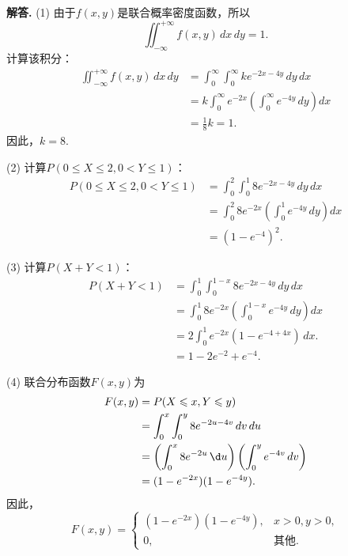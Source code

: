\documentclass[12pt, a4paper, oneside]{ctexart}
\newenvironment{solution}{\par\noindent\textbf{解答. }}{\par}
\begin{document}
\begin{solution}
    (1) 由于$f(x,y)$是联合概率密度函数，所以
    \[\iint_{-\infty}^{+\infty} f(x,y) \, dx \, dy = 1.\]
    计算该积分：
    \begin{align*}
    \iint_{-\infty}^{+\infty} f(x,y) \, dx \, dy &= \int_{0}^{\infty} \int_{0}^{\infty} ke^{-2x-4y} \, dy \, dx \\
    &= k \int_{0}^{\infty} e^{-2x} \left( \int_{0}^{\infty} e^{-4y} \, dy \right) dx \\
    &= \frac{1}{8}k = 1.
    \end{align*}
    因此，$k=8$.

    (2) 计算$P(0\leqslant X\leqslant 2,0<Y\leqslant 1)$：
    \begin{align*}
    P(0\leqslant X\leqslant 2,0<Y\leqslant 1) &= \int_{0}^{2} \int_{0}^{1} 8e^{-2x-4y} \, dy \, dx \\
    &= \int_{0}^{2} 8e^{-2x} \left( \int_{0}^{1} e^{-4y} \, dy \right) dx \\
    &= (1 - e^{-4})^2.
    \end{align*}

    (3) 计算$P(X+Y<1)$：
    \begin{align*}
    P(X+Y<1) &= \int_{0}^{1} \int_{0}^{1-x} 8e^{-2x-4y} \, dy \, dx \\
    &= \int_{0}^{1} 8e^{-2x} \left( \int_{0}^{1-x} e^{-4y} \, dy \right) dx \\
    &= 2 \int_{0}^{1} e^{-2x} (1 - e^{-4 + 4x}) \, dx. \\
    &= 1 - 2e^{-2} + e^{-4}.
    \end{align*}

    (4) 联合分布函数$F(x,y)$为
    \begin{align*}
    F(x,y) &= P(X \leqslant x, Y \leqslant y) \\
    &= \int_{0}^{x} \int_{0}^{y} 8e^{-2u-4v} \, dv \, du \\
    &= \left( \int_{0}^{x} 8e^{-2u} \,\d u\right) \left( \int_{0}^{y} e^{-4v} \, dv \right) \\
    &= (1 - e^{-2x})(1 - e^{-4y}).
    \end{align*}
    因此，
    \[F(x,y)=\begin{cases}
    (1 - e^{-2x})(1 - e^{-4y}), & x>0, y>0, \\
     0, & \text{其他}.
    \end{cases}\]
\end{solution}
\end{document}
